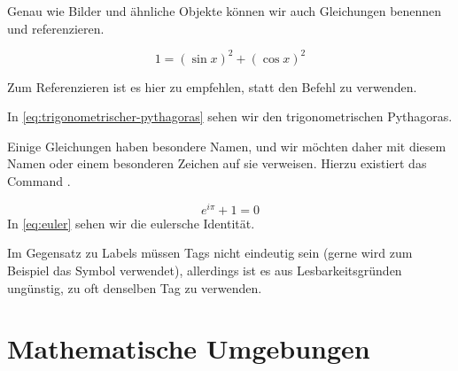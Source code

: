 Genau wie Bilder und ähnliche Objekte können wir auch Gleichungen benennen und referenzieren.
\begin{latexlisting}
	\begin{equation}\label{eq:trigonometrischer-pythagoras}
		1 = (\sin x)^2 + (\cos x)^2
	\end{equation}
\end{latexlisting}
Zum Referenzieren ist es hier zu empfehlen, statt  den Befehl  zu verwenden.
\begin{latexlisting}
	In \eqref{eq:trigonometrischer-pythagoras} sehen wir den trigonometrischen Pythagoras.
\end{latexlisting}
Einige Gleichungen haben besondere Namen, und wir möchten daher mit diesem Namen oder einem besonderen Zeichen auf sie verweisen.
Hierzu existiert das Command .
\begin{latexlisting}
	\begin{equation}\label{eq:euler}\tag{Euler}
		e^{i \pi} + 1 = 0
	\end{equation}
	In \eqref{eq:euler} sehen wir die eulersche Identität.
\end{latexlisting}
Im Gegensatz zu Labels müssen Tags nicht eindeutig sein (gerne wird zum Beispiel das Symbol \star{} verwendet), allerdings ist es aus Lesbarkeitsgründen ungünstig, zu oft denselben Tag zu verwenden.

\section{Mathematische Umgebungen}

